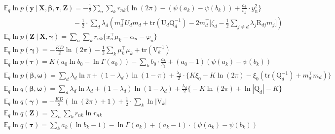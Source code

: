 \documentclass[twoside,11pt]{article}
\newcommand\given[1][]{\:#1\vert\:}
\newcommand{\transpose}[1]{#1^{\intercal}}
\newcommand{\nsum}{\sum\limits_{n}}
\newcommand{\ksum}{\sum\limits_{k}}
\newcommand{\boldbeta}{\boldsymbol\beta}
\newcommand{\boldgamma}{\boldsymbol\gamma}
\newcommand{\boldomega}{\boldsymbol\omega}
\newcommand{\boldtau}{\boldsymbol\tau}
\newcommand{\E}{\mathbb{E}}
\newcommand{\qmat}{\mathrm{Q}}
\newcommand{\trace}[1]{\mathrm{tr} \left( #1 \right)}
\begin{document}
\begin{align*}
	& \E_q \ln p\left( \mathbf{y} \given \mathbf{X}, \boldbeta, \boldtau, \mathbf{Z} \right) = - \frac{1}{2} \nsum \ksum r_{nk} \Big\{  \ln(2\pi) - (\psi(a_k) - \psi(b_k)) + \frac{a_k}{b_k} \cdot y_n^2 \Big\} \\ & \qquad \qquad \qquad\qquad \qquad - \frac{1}{2} \cdot \sum_d \lambda_d \left( \transpose{m_d} U_d m_d + \trace{\mathrm{U}_d \mathrm{Q}_d^{-1}} - 2\transpose{m_d} \Bigg[ \zeta_d - \frac{1}{2} \sum_{j\neq d} \lambda_j \mathrm{R}_{dj} m_j\Bigg] \right)\\
	& \E_q \ln p\left( \mathbf{Z} \given \mathbf{X}, \boldgamma \right)  = \nsum \ksum r_{nk} \Big\{ \transpose{x_n} \mu_k - \alpha_n - \varphi_n \Big\}\\
	& \E_q \ln p\left( \boldgamma \right) = -\frac{KD}{2} \ln(2\pi) - \frac{1}{2} \ksum  \transpose{\mu_k} \mu_k + \trace{\mathrm{V}_k^{-1}}  \\
	& \E_q \ln p\left( \boldtau \right) = K \left( a_0 \ln b_0 - \ln \Gamma(a_0) \right) - \ksum b_0 \cdot \frac{a_k}{b_k} + (a_0 - 1) \left( \psi(a_k) - \psi(b_k) \right) \\
	& \E_q \ln p\left( \boldbeta, \boldomega \right) = \sum_d \lambda_d \ln \pi + (1 - \lambda_d) \ln (1 - \pi) + \frac{\lambda_d}{2} \cdot \Big\{ K \xi_0 - K \ln (2 \pi) - \xi_0 \left( \trace{\qmat_d^{-1}} + \transpose{m_d}m_d \right) \Big\} \\
	& \E_q \ln q\left( \boldbeta, \boldomega \right) = \sum_d \lambda_d \ln \lambda_d + (1 - \lambda_d) \ln (1-\lambda_d) + \frac{\lambda_d}{2} \Big\{ - K \ln (2\pi) + \ln |\qmat_d| - K\Big\}\\
	& \E_q \ln q\left( \boldgamma \right) = - \frac{KD}{2} \left( \ln(2\pi) + 1 \right) + \frac{1}{2} \cdot \ksum \ln |\mathrm{V}_k| \\
	& \E_q \ln q\left( \mathbf{Z} \right) = \nsum \ksum r_{nk} \ln r_{nk} \\
	& \E_q \ln q\left( \mathbf{\tau} \right) = \ksum a_k \left( \ln b_k - 1 \right) - \ln \Gamma(a_k)  + (a_k - 1) \cdot \left( \psi(a_k) - \psi(b_k) \right)
\end{align*}








\end{document}
